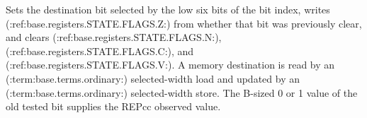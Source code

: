 Sets the destination bit selected by the low six bits of the bit index, writes (:ref:base.registers.STATE.FLAGS.Z:) from whether that bit was previously clear, and clears (:ref:base.registers.STATE.FLAGS.N:), (:ref:base.registers.STATE.FLAGS.C:), and (:ref:base.registers.STATE.FLAGS.V:). A memory destination is read by an (:term:base.terms.ordinary:) selected-width load and updated by an (:term:base.terms.ordinary:) selected-width store. The B-sized 0 or 1 value of the old tested bit supplies the REPcc observed value.
